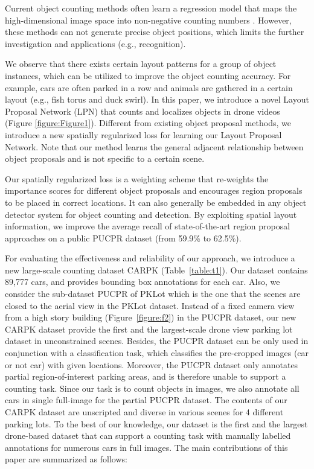 \documentclass[10pt,twocolumn,letterpaper]{article}
\begin{document}
Current object counting methods often learn a regression model that maps the high-dimensional image space into non-negative counting numbers \cite{39_wang2011automatic,04_mundhenk2016large}.
However, these methods can not generate precise object positions, which limits the further investigation and applications (e.g., recognition). 

We observe that there exists certain layout patterns for a group of object instances, which can be utilized to improve the object counting accuracy.  
For example, cars are often parked in a row and animals are gathered in a certain layout (e.g., fish torus and duck swirl). 
In this paper, we introduce a novel Layout Proposal Network (LPN) that counts and localizes objects in drone videos (Figure \ref{figure:Figure1}).
Different from existing object proposal methods, we introduce a new spatially regularized loss for learning our Layout Proposal Network. Note that our method learns the general adjacent relationship between object proposals and is not specific to a certain scene.  

Our spatially regularized loss is a weighting scheme that re-weights the importance scores for different object proposals and encourages region proposals to be placed in correct locations. 
It can also generally be embedded in any object detector system for object counting and detection. 
By exploiting spatial layout information, we improve the average recall of state-of-the-art region proposal approaches on a public PUCPR dataset \cite{01_de2015pklot} (from 59.9\% to 62.5\%). 

For evaluating the effectiveness and reliability of our approach, we introduce a new large-scale counting dataset CARPK (Table~\ref{table:t1}). 
Our dataset contains 89,777 cars, and provides bounding box annotations for each car.
Also, we consider the sub-dataset PUCPR of PKLot \cite{01_de2015pklot} which is the one that the scenes are closed to the aerial view in the PKLot dataset. Instead of a fixed camera view from a high story building (Figure~\ref{figure:f2}) in the PUCPR dataset, our new CARPK dataset provide the first and the largest-scale drone view parking lot dataset in unconstrained scenes.
Besides, the PUCPR dataset can be only used in conjunction with a classification task, which classifies the pre-cropped images (car or not car) with given locations. 
Moreover, the PUCPR dataset only annotates partial region-of-interest parking areas, and is therefore unable to support a counting task. 
Since our task is to count objects in images, we also annotate all cars in single full-image for the partial PUCPR dataset. 
The contents of our CARPK dataset are unscripted and diverse in various scenes for 4 different parking lots. 
To the best of our knowledge, our dataset is the first and the largest drone-based dataset that can support a counting task with manually labelled annotations for numerous cars in full images. 
The main contributions of this paper are summarized as follows:
 
\end{document}
